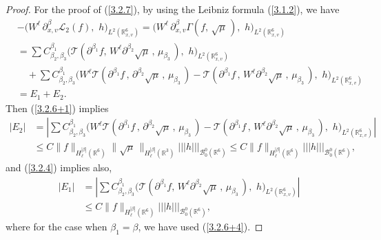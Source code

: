 \documentclass{amsart}[12pt, article]
\begin{document}
\begin{proof} For the proof of (\ref{3.2.7}), by using the
Leibniz formula (\ref{3.1.2}), we have
\begin{align*}
& -\Big(W^\ell \,\partial^\beta_{x, v} {{\mathcal L}}_2(f),\,\,
h\Big)_{L^2({{{\mathbb R}}}^6_{x, v})}=\Big(W^\ell \,\partial^\beta_{x, v}
\Gamma(f,\, \sqrt\mu\,),\,\,
h\Big)_{L^2({{{\mathbb R}}}^6_{x, v})}\\
&= \sum C^{\beta_1}_{\beta_2, \beta_3} \Big({{\mathcal T}}(\partial^{\beta_1}
f,\, W^\ell \partial^{\beta_2} \sqrt\mu\,,\,
\mu_{\beta_3}\,) ,\,\, h\Big)_{L^2({{{\mathbb R}}}^6_{x, v})}\\
&\quad+\sum C^{\beta_1}_{\beta_2, \beta_3}
\Big(W^\ell{{\mathcal T}}(\partial^{\beta_1} f\,,\, \partial^{\beta_2}
\sqrt\mu\,,\, \mu_{\beta_3}\,) - {{\mathcal T}}(\partial^{\beta_1} f\,,\,
W^\ell
\partial^{\beta_2} \sqrt\mu\,,\, \mu_{\beta_3}\,) ,\,\,
h\Big)_{L^2({{{\mathbb R}}}^6_{x, v})}\\
&=E_1+E_2.
\end{align*}
Then (\ref{3.2.6+1}) implies
\begin{align*}
|E_2|&=\left|\sum C^{\beta_1}_{\beta_2, \beta_3}
\Big(W^\ell{{\mathcal T}}(\partial^{\beta_1} f\,,\, \partial^{\beta_2}
\sqrt\mu\,,\, \mu_{\beta_3}\,) - {{\mathcal T}}(\partial^{\beta_1} f\,,\,
W^\ell
\partial^{\beta_2} \sqrt\mu\,,\, \mu_{\beta_3}\,) ,\,\,
h\Big)_{L^2({{{\mathbb R}}}^6_{x, v})}\right|\\
&\leq C\|f\|_{H^{|\beta|}_\ell({{{\mathbb R}}}^6)}
\|\sqrt\mu\,\|_{H^{|\beta|}_\ell({{{\mathbb R}}}^3)} ||| h|||_{{{\mathcal B}}^0_0({{{\mathbb R}}}^6)}
\leq C\|f\|_{H^{|\beta|}_\ell({{{\mathbb R}}}^6)} ||| h|||_{{{\mathcal B}}^0_0({{{\mathbb R}}}^6)},
\end{align*}
and (\ref{3.2.4}) implies also,
\begin{align*}
|E_1|&=\left|\sum C^{\beta_1}_{\beta_2, \beta_3}
\Big({{\mathcal T}}(\partial^{\beta_1} f,\, W^\ell \partial^{\beta_2}
\sqrt\mu\,,\, \mu_{\beta_3}\,) ,\,\, h\Big)_{L^2({{{\mathbb R}}}^6_{x,
v})}\right|\\
&\leq C \|f\|_{H^{|\beta|}_\ell({{{\mathbb R}}}^6)} ||| h|||_{{{\mathcal B}}^0_0({{{\mathbb R}}}^6)},
\end{align*}
where for the case when $\beta_1=\beta$, we have used
(\ref{3.2.6+4}).


\end{proof}
\end{document}
